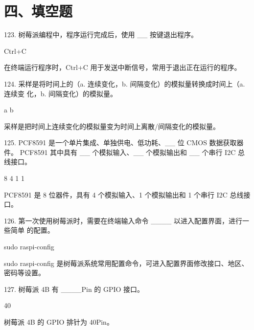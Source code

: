 \section{四、填空题}

\begin{question}{123. 树莓派编程中，程序运行完成后，使用 \_\_ 按键退出程序。}
\end{question}
\begin{answer}
Ctrl+C
\end{answer}
\begin{explanation}
在终端运行程序时，Ctrl+C 用于发送中断信号，常用于退出正在运行的程序。
\end{explanation}

\begin{question}{124. 采样是将时间上的（a. 连续变化，b. 间隔变化）的模拟量转换成时间上（a. 连续变 化，b. 间隔变化）的模拟量。}
\end{question}
\begin{answer}
a b
\end{answer}
\begin{explanation}
采样是把时间上连续变化的模拟量变为时间上离散/间隔变化的模拟量。
\end{explanation}

\begin{question}{125. PCF8591 是一个单片集成、单独供电、低功耗、\_\_ 位 CMOS 数据获取器件。 PCF8591 其中具有 \_\_ 个模拟输入、\_\_ 个模拟输出和 \_\_ 个串行 I2C 总线接口。}
\end{question}
\begin{answer}
8 4 1 1
\end{answer}
\begin{explanation}
PCF8591 是 8 位器件，具有 4 个模拟输入、1 个模拟输出和 1 个串行 I2C 总线接口。
\end{explanation}

\begin{question}{126. 第一次使用树莓派时，需要在终端输入命令 \_\_\_\_ 以进入配置界面，进行一些简单 的配置。}
\end{question}
\begin{answer}
sudo raspi-config
\end{answer}
\begin{explanation}
sudo raspi-config 是树莓派系统常用配置命令，可进入配置界面修改接口、地区、密码等设置。
\end{explanation}

\begin{question}{127. 树莓派 4B 有 \_\_\_\_Pin 的 GPIO 接口。}
\end{question}
\begin{answer}
40
\end{answer}
\begin{explanation}
树莓派 4B 的 GPIO 排针为 40Pin。
\end{explanation}


